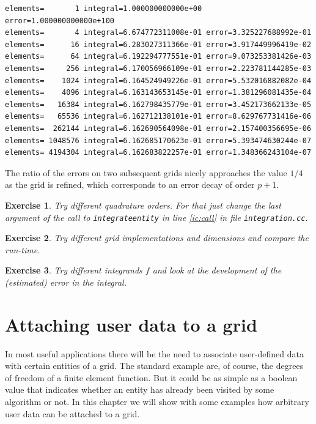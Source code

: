 \documentclass[11pt,a4paper,headinclude,footinclude,DIV16,headings=normal]{scrreprt}
\newtheorem{exc}{Exercise}[chapter]
\begin{document}
\begin{lstlisting}[basicstyle=\ttfamily\scriptsize]
elements=       1 integral=1.000000000000e+00 error=1.000000000000e+100
elements=       4 integral=6.674772311008e-01 error=3.325227688992e-01
elements=      16 integral=6.283027311366e-01 error=3.917449996419e-02
elements=      64 integral=6.192294777551e-01 error=9.073253381426e-03
elements=     256 integral=6.170056966109e-01 error=2.223781144285e-03
elements=    1024 integral=6.164524949226e-01 error=5.532016882082e-04
elements=    4096 integral=6.163143653145e-01 error=1.381296081435e-04
elements=   16384 integral=6.162798435779e-01 error=3.452173662133e-05
elements=   65536 integral=6.162712138101e-01 error=8.629767731416e-06
elements=  262144 integral=6.162690564098e-01 error=2.157400356695e-06
elements= 1048576 integral=6.162685170623e-01 error=5.393474630244e-07
elements= 4194304 integral=6.162683822257e-01 error=1.348366243104e-07
\end{lstlisting}

The ratio of the errors on two subsequent grids nicely approaches the
value $1/4$ as the grid is refined, which corresponds to an error
decay of order $p+1$.


\begin{exc} Try different quadrature orders. For that just change the
  last argument of the call to \lstinline!integrateentity! in line
  \ref{ic:call} in file \lstinline!integration.cc!.
\end{exc}

\begin{exc} Try different grid implementations and dimensions and
  compare the run-time.
\end{exc}

\begin{exc} Try different integrands $f$ and look at the development
  of the (estimated) error in the integral.
\end{exc}

\chapter{Attaching user data to a grid}

In most useful applications there will be the need to associate
user-defined data with certain entities of a grid. The standard
example are, of course, the degrees of freedom of a finite element
function. But it could be as simple as a boolean value that indicates
whether an entity has already been visited by some algorithm or
not. In this chapter we will show with some examples how arbitrary
user data can be attached to a grid.
\end{document}
